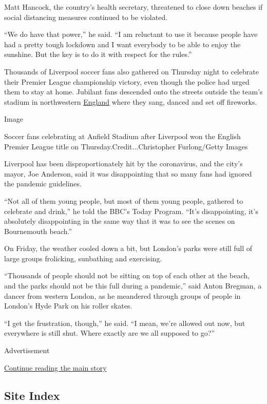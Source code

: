 Matt Hancock, the country's health secretary, threatened to close down
beaches if social distancing measures continued to be violated.

``We do have that power,'' he said. ``I am reluctant to use it because
people have had a pretty tough lockdown and I want everybody to be able
to enjoy the sunshine. But the key is to do it with respect for the
rules.''

Thousands of Liverpool soccer fans also gathered on Thursday night to
celebrate their Premier League championship victory, even though the
police had urged them to stay at home. Jubilant fans descended onto the
streets outside the team's stadium in northwestern
\href{https://www.nytimes3xbfgragh.onion/2020/07/03/world/europe/britain-quarantine-us-coronavirus.html}{England}
where they sang, danced and set off fireworks.

Image

Soccer fans celebrating at Anfield Stadium after Liverpool won the
English Premier League title on Thursday.Credit...Christopher
Furlong/Getty Images

Liverpool has been disproportionately hit by the coronavirus, and the
city's mayor, Joe Anderson, said it was disappointing that so many fans
had ignored the pandemic guidelines.

``Not all of them young people, but most of them young people, gathered
to celebrate and drink,'' he told the BBC's Today Program. ``It's
disappointing, it's absolutely disappointing in the same way that it was
to see the scenes on Bournemouth beach.''

On Friday, the weather cooled down a bit, but London's parks were still
full of large groups frolicking, sunbathing and exercising.

``Thousands of people should not be sitting on top of each other at the
beach, and the parks should not be this full during a pandemic,'' said
Anton Bregman, a dancer from western London, as he meandered through
groups of people in London's Hyde Park on his roller skates.

``I get the frustration, though,'' he said. ``I mean, we're allowed out
now, but everywhere is still shut. Where exactly are we all supposed to
go?''

Advertisement

\protect\hyperlink{after-bottom}{Continue reading the main story}

\hypertarget{site-index}{%
\subsection{Site Index}\label{site-index}}

